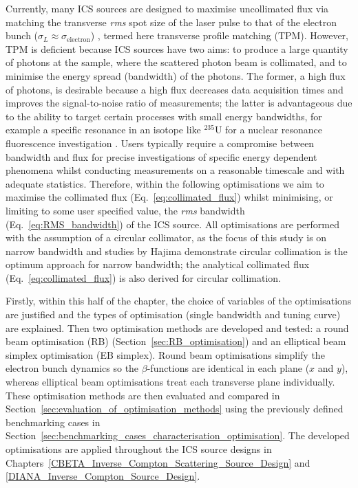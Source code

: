 \documentclass[../main.tex]{subfiles}
\begin{document}
Currently, many ICS sources are designed to maximise uncollimated flux via matching the transverse \textit{rms} spot size of the laser pulse to that of the electron bunch ($\sigma_{L}\approx\sigma_{\mathrm{electron}}$) \cite{akagi2016narrow,deitrick2018high,jacquet2015radiation,drebot2019brixs,pan2019design,dupraz2020thomx}, termed here transverse profile matching (TPM). However, TPM is deficient because ICS sources have two aims: to produce a large quantity of photons at the sample, where the scattered photon beam is collimated, and to minimise the energy spread (bandwidth) of the photons. The former, a high flux of photons, is desirable because a high flux decreases data acquisition times and improves the signal-to-noise ratio of measurements; the latter is advantageous due to the ability to target certain processes with small energy bandwidths, for example a specific resonance in an isotope like $^{235}\mathrm{U}$ for a nuclear resonance fluorescence investigation \cite{hayakawa2010nondestructive}. Users typically require a compromise between bandwidth and flux for precise investigations of specific energy dependent phenomena whilst conducting measurements on a reasonable timescale and with adequate statistics. Therefore, within the following optimisations we aim to maximise the collimated flux (Eq.~\ref{eq:collimated_flux}) whilst minimising, or limiting to some user specified value, the \textit{rms} bandwidth (Eq.~\ref{eq:RMS_bandwidth}) of the ICS source. All optimisations are performed with the assumption of a circular collimator, as the focus of this study is on narrow bandwidth and studies by Hajima \cite{hajima2021bandwidth} demonstrate circular collimation is the optimum approach for narrow bandwidth; the analytical collimated flux (Eq.~\ref{eq:collimated_flux}) is also derived for circular collimation.

Firstly, within this half of the chapter, the choice of variables of the optimisations are justified and the types of optimisation (single bandwidth and tuning curve) are explained. Then two optimisation methods are developed and tested: a round beam optimisation (RB) (Section~\ref{sec:RB_optimisation}) and an elliptical beam simplex optimisation (EB simplex). Round beam optimisations simplify the electron bunch dynamics so the $\beta$-functions are identical in each plane ($x$ and $y$), whereas elliptical beam optimisations treat each transverse plane individually. These optimisation methods are then evaluated and compared in Section~\ref{sec:evaluation_of_optimisation_methods} using the previously defined benchmarking cases in Section~\ref{sec:benchmarking_cases_characterisation_optimisation}. The developed optimisations are applied throughout the ICS source designs in Chapters~\ref{CBETA_Inverse_Compton_Scattering_Source_Design} and \ref{DIANA_Inverse_Compton_Source_Design}.    
\end{document}
